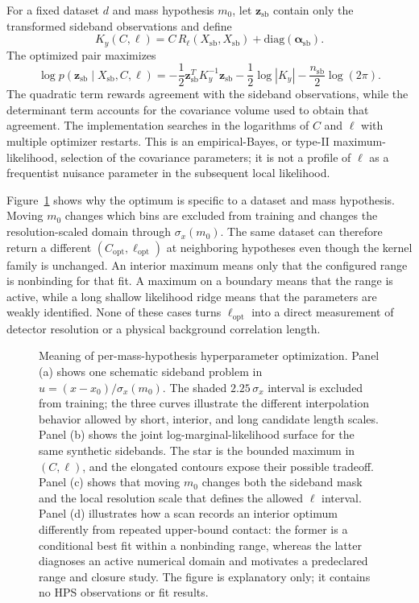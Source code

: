 For a fixed dataset $d$ and mass hypothesis $m_0$, let
$\bm{z}_{\mathrm{sb}}$ contain only the transformed sideband observations and define
\begin{equation}
K_y(C,\ell)
= C\,R_{\ell}(X_{\mathrm{sb}},X_{\mathrm{sb}})
+ \mathrm{diag}(\bm{\alpha}_{\mathrm{sb}}).
\end{equation}
The optimized pair maximizes
\begin{equation}
\log p(\bm{z}_{\mathrm{sb}}\mid X_{\mathrm{sb}},C,\ell)
= -\frac{1}{2}\bm{z}_{\mathrm{sb}}^{T}K_y^{-1}\bm{z}_{\mathrm{sb}}
  -\frac{1}{2}\log|K_y|
  -\frac{n_{\mathrm{sb}}}{2}\log(2\pi).
\label{eq:gpr-log-marginal-likelihood}
\end{equation}
The quadratic term rewards agreement with the sideband observations, while the
determinant term accounts for the covariance volume used to obtain that agreement.
The implementation searches in the logarithms of $C$ and $\ell$ with multiple
optimizer restarts. This is an empirical-Bayes, or type-II maximum-likelihood,
selection of the covariance parameters; it is not a profile of $\ell$ as a
frequentist nuisance parameter in the subsequent local \CLs{} likelihood.

Figure~\ref{fig:gpr-mass-hypothesis-optimization} shows why the optimum is specific
to a dataset and mass hypothesis. Moving $m_0$ changes which bins are excluded from
training and changes the resolution-scaled domain through $\sigma_x(m_0)$. The same
dataset can therefore return a different $(C_{\mathrm{opt}},\ell_{\mathrm{opt}})$ at
neighboring hypotheses even though the kernel family is unchanged. An interior
maximum means only that the configured range is nonbinding for that fit. A maximum on
a boundary means that the range is active, while a long shallow likelihood ridge means
that the parameters are weakly identified. None of these cases turns
$\ell_{\mathrm{opt}}$ into a direct measurement of detector resolution or a physical
background correlation length.

\begin{figure}[H]
\centering
{}
\caption{Meaning of per-mass-hypothesis hyperparameter optimization. Panel (a)
shows one schematic sideband problem in
$u=(x-x_0)/\sigma_x(m_0)$. The shaded $2.25\,\sigma_x$ interval is excluded from
training; the three curves illustrate the different interpolation behavior allowed
by short, interior, and long candidate length scales. Panel (b) shows the joint
log-marginal-likelihood surface for the same synthetic sidebands. The star is the
bounded maximum in $(C,\ell)$, and the elongated contours expose their possible
tradeoff. Panel (c) shows that moving $m_0$ changes both the sideband mask and the
local resolution scale that defines the allowed $\ell$ interval. Panel (d) illustrates
how a scan records an interior optimum differently from repeated upper-bound contact:
the former is a conditional best fit within a nonbinding range, whereas the latter
diagnoses an active numerical domain and motivates a predeclared range and closure
study. The figure is explanatory only; it contains no HPS observations or fit
results.}
\label{fig:gpr-mass-hypothesis-optimization}
\end{figure}

